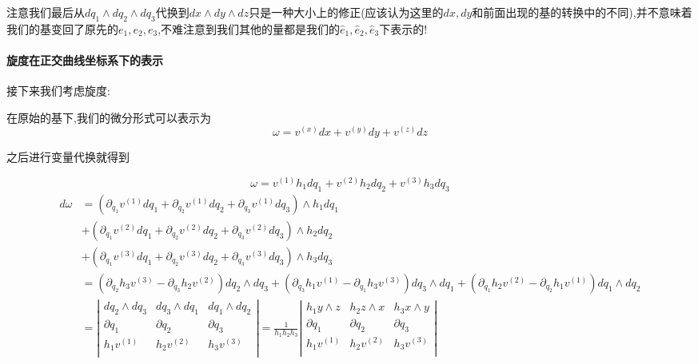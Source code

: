 \documentclass[11pt,hyperref,a4paper,UTF8]{ctexart}
\begin{document}
\begin{CJK}{UTF8}{gkai}
注意我们最后从$dq_1 \wedge dq_2 \wedge dq_3$代换到$dx \wedge dy \wedge dz$只是一种大小上的修正(应该认为这里的$dx,dy$和前面出现的基的转换中的不同),并不意味着我们的基变回了原先的$e_1,e_2,e_3$,不难注意到我们其他的量都是我们的$\hat{e}_1,\hat{e}_2,\hat{e}_3$下表示的!

\paragraph{旋度在正交曲线坐标系下的表示\\}
接下来我们考虑旋度:

在原始的基下,我们的微分形式可以表示为
\[\omega = v^{(x)} dx + v^{(y)} dy + v^{(z)}dz\]

之后进行变量代换就得到

\[\omega = v^{(1)}h_1 dq_1 + v^{(2)} h_2 dq_2 + v^{(3)} h_3 dq_3\]
\[
\begin{aligned}
  d\omega &= (\partial_{q_1} v^{(1)} dq_1 + \partial_{q_2} v^{(1)}dq_2 + \partial_{q_3} v^{(1)} dq_3 ) \wedge h_1 dq_1\\
  &+(\partial_{q_1} v^{(2)} dq_1 + \partial_{q_2} v^{(2)}dq_2 + \partial_{q_3} v^{(2)} dq_3 ) \wedge h_2 dq_2\\
  &+(\partial_{q_1} v^{(3)} dq_1 + \partial_{q_2} v^{(3)}dq_2 + \partial_{q_3} v^{(3)} dq_3 ) \wedge h_3 dq_3\\
  &=  (\partial_{q_2} h_3 v^{(3)} - \partial_{q_3} h_2 v^{(2)}) dq_2\wedge dq_3 + (\partial_{q_3} h_1 v^{(1)} - \partial_{q_1} h_3 v^{(3)}) dq_3 \wedge dq_1 + (\partial_{q_1} h_2 v^{(2)} - \partial_{q_2} h_1 v^{(1)})dq_1 \wedge dq_2 \\
  &= \left|\begin{matrix}
    dq_2 \wedge dq_3 & dq_3 \wedge dq_1 & dq_1 \wedge dq_2\\
    \partial q_1 & \partial q_2 & \partial q_3\\
    h_1 v^{(1)} & h_2 v^{(2)} & h_3 v^{(3)}\\
  \end{matrix}\right| = \frac{1}{h_1 h_2 h_3}\left|\begin{matrix}
    h_1 y \wedge z & h_2  z \wedge x & h_3 x \wedge y\\
    \partial q_1 & \partial q_2 & \partial q_3\\
    h_1 v^{(1)} & h_2 v^{(2)} & h_3 v^{(3)}\\
  \end{matrix}\right|\\
\end{aligned}
\]


\end{CJK}
\end{document}
